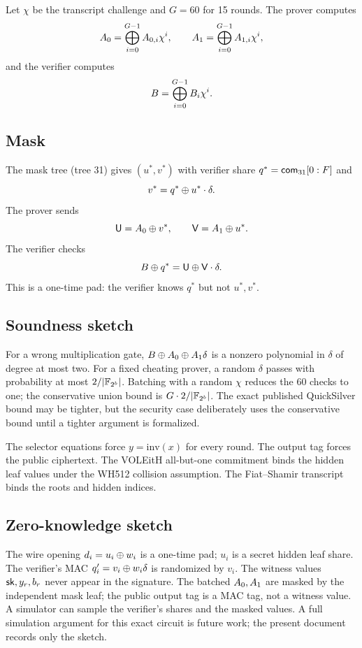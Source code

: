 \documentclass[11pt,a4paper]{article}
\begin{document}
Let $\chi$ be the transcript challenge and $G=60$ for 15 rounds. The prover
computes
\[
A_0=\bigoplus_{i=0}^{G-1}A_{0,i}\chi^i,\qquad
A_1=\bigoplus_{i=0}^{G-1}A_{1,i}\chi^i,
\]
and the verifier computes
\[
B=\bigoplus_{i=0}^{G-1}B_i\chi^i.
\]

\subsection{Mask}

The mask tree (tree 31) gives $(u^\ast,v^\ast)$ with verifier share
$q^\ast=\mathsf{com}_{31}[0:F]$ and
\[
v^\ast=q^\ast\oplus u^\ast\cdot\delta.
\]
The prover sends
\[
\mathsf{U}=A_0\oplus v^\ast,\qquad \mathsf{V}=A_1\oplus u^\ast.
\]
The verifier checks
\[
B\oplus q^\ast=\mathsf{U}\oplus\mathsf{V}\cdot\delta.
\]
This is a one-time pad: the verifier knows $q^\ast$ but not $u^\ast,v^\ast$.

\subsection{Soundness sketch}

For a wrong multiplication gate, $B\oplus A_0\oplus A_1\delta$ is a nonzero
polynomial in $\delta$ of degree at most two. For a fixed cheating prover, a
random $\delta$ passes with probability at most $2/|\mathbb{F}_{2^{b}}|$. Batching with a
random $\chi$ reduces the 60 checks to one; the conservative union bound is
$G\cdot2/|\mathbb{F}_{2^{b}}|$. The exact published QuickSilver bound may be tighter, but
the security case deliberately uses the conservative bound until a tighter
argument is formalized.

The selector equations force $y=\mathrm{inv}(x)$ for every round. The output
tag forces the public ciphertext. The VOLEitH all-but-one commitment binds the
hidden leaf values under the WH512 collision assumption. The Fiat--Shamir
transcript binds the roots and hidden indices.

\subsection{Zero-knowledge sketch}

The wire opening $d_i=u_i\oplus w_i$ is a one-time pad; $u_i$ is a secret hidden
leaf share. The verifier's MAC $q_i'=v_i\oplus w_i\delta$ is randomized by
$v_i$. The witness values $\mathsf{sk},y_r,b_r$ never appear in the signature. The
batched $A_0,A_1$ are masked by the independent mask leaf; the public
output tag is a MAC tag, not a witness value. A simulator can sample the
verifier's shares and the masked values. A full simulation argument for this
exact circuit is future work; the present document records only the sketch.
\end{document}
